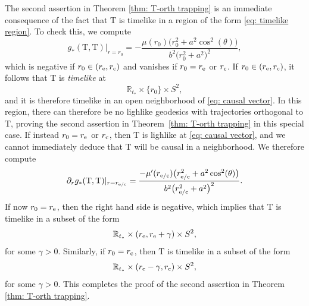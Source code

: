 \documentclass[pdftex]{sigma}
\renewcommand{\d}{\partial}
\newcommand{\T}{\mathrm T}
\newcommand{\R}[0]{\mathbb{R}}
\numberwithin{equation}{section}
\begin{document}
\begin{Remark} \label{rmk: second assertion}
The second assertion in Theorem \ref{thm: T-orth trapping} is an immediate consequence of the fact that $\T$ is timelike in a region of the form \eqref{eq: timelike region}.
To check this, we compute
\[ %
	g_*(\T,\T)|_{r = r_0}
		= - \frac{\mu(r_0)\big(r_0^2 + a^2 \cos^2(\theta)\big)}{b^2\big(r_0^2 + a^2\big)^2},
\]
which is negative if $r_0 \in (r_{\rm e}, r_{\rm c})$ and vanishes if $r_0 = r_{\rm e}$ or $r_{\rm c}$.
If $r_0 \in (r_{\rm e}, r_{\rm c})$, it follows that $\T$ is \emph{timelike} at
\begin{equation} \label{eq: causal vector}
	\R_{t_*} \times \{r_0\} \times S^2,
\end{equation}
and it is therefore timelike in an open neighborhood of \eqref{eq: causal vector}.
In this region, there can therefore be no lighlike geodesics with trajectories orthogonal to $\T$, proving the second assertion in Theorem~\ref{thm: T-orth trapping} in this special case.
If instead $r_0 = r_{\rm e}$ or $r_{\rm c}$, then $\T$ is lighlike at \eqref{eq: causal vector}, and we cannot immediately deduce that $\T$ will be causal in a neighborhood.
We therefore compute
\begin{align*}
	\d_r g_*(\T, \T)|_{r = r_{\rm e/c}}
		= \frac{-\mu'(r_{\rm e/c}) \big(r_{\rm e/c}^2 + a^2\cos^2(\theta)\big)}{b^2 \big(r_{\rm e/c}^2 + a^2\big)^2}.
\end{align*}
If now $r_0 = r_{\rm e}$, then the right hand side is negative, which implies that $\T$ is timelike in a subset of the form
\[
	\R_{t_*} \times (r_{\rm e}, r_{\rm e} + \gamma) \times S^2,
\]
for some $\gamma > 0$.
Similarly, if $r_0 = r_{\rm c}$, then $\T$ is timelike in a subset of the form
\[
	\R_{t_*} \times (r_{\rm c} - \gamma, r_{\rm c}) \times S^2,
\]
for some $\gamma > 0$.
This completes the proof of the second assertion in Theorem \ref{thm: T-orth trapping}.
\end{Remark}
\end{document}
